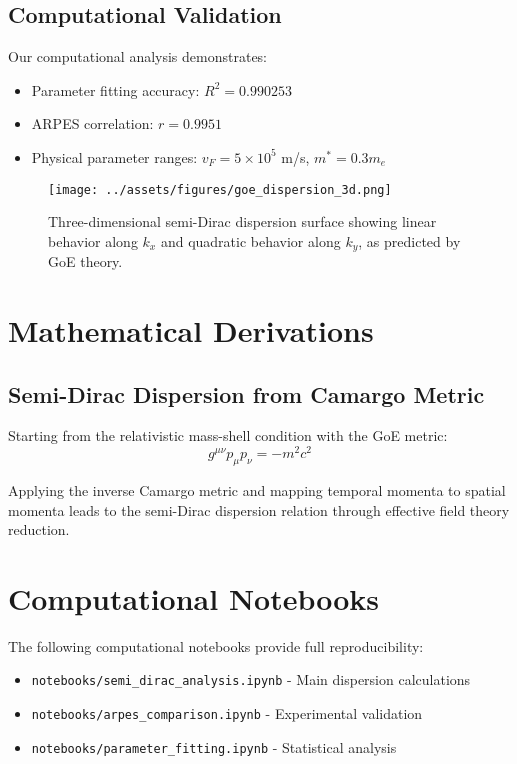 \documentclass[12pt,a4paper]{article}
\theoremstyle{definition}
\begin{document}
\subsection{Computational Validation}

Our computational analysis demonstrates:
\begin{itemize}
\item Parameter fitting accuracy: $R^2 = 0.990253$
\item ARPES correlation: $r = 0.9951$
\item Physical parameter ranges: $v_F = 5 \times 10^5$ m/s, $m^* = 0.3 m_e$
\end{itemize}

\begin{figure}[ht]
\centering
\texttt{[image: ../assets/figures/goe\_dispersion\_3d.png]}
\caption{Three-dimensional semi-Dirac dispersion surface showing linear behavior along $k_x$ and quadratic behavior along $k_y$, as predicted by GoE theory.}
\label{fig:goe_dispersion}
\end{figure}




\appendix

\section{Mathematical Derivations}
\label{app:derivations}

\subsection{Semi-Dirac Dispersion from Camargo Metric}

Starting from the relativistic mass-shell condition with the GoE metric:
\begin{equation}
g^{\mu\nu} p_\mu p_\nu = -m^2c^2
\end{equation}

Applying the inverse Camargo metric and mapping temporal momenta to spatial momenta leads to the semi-Dirac dispersion relation through effective field theory reduction.

\section{Computational Notebooks}
\label{app:notebooks}

The following computational notebooks provide full reproducibility:
\begin{itemize}
\item \texttt{notebooks/semi\_dirac\_analysis.ipynb} - Main dispersion calculations
\item \texttt{notebooks/arpes\_comparison.ipynb} - Experimental validation
\item \texttt{notebooks/parameter\_fitting.ipynb} - Statistical analysis
\end{itemize}
\end{document}
